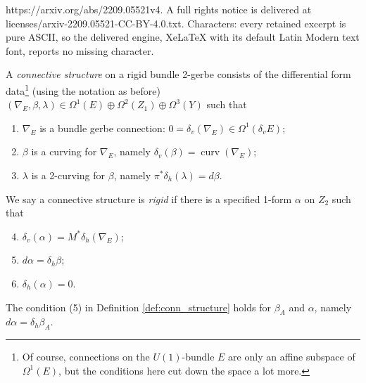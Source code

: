 \documentclass[10pt,a4paper]{amsart}
\DeclareMathOperator{\curv}{curv}
\begin{document}
https://arxiv.org/abs/2209.05521v4. A full rights notice is delivered at licenses/arxiv-2209.05521-CC-BY-4.0.txt. Characters: every retained excerpt is pure ASCII, so the delivered engine, XeLaTeX with its default Latin Modern text font, reports no missing character.
\begin{definition}\label{def:conn_structure}
A \emph{connective structure} on a rigid bundle 2-gerbe consists of the differential form data\footnote{Of course, connections on the $U(1)$-bundle $E$ are only an affine subspace of $\Omega^1(E)$, but the conditions here cut down the space a lot more.} (using the notation as before) $(\nabla_E,\beta,\lambda) \in \Omega^1(E) \oplus \Omega^2(Z_1) \oplus  \Omega^3(Y)$ such that
\begin{enumerate}
\item $\nabla_E$ is a bundle gerbe connection: $0=\delta_v(\nabla_E) \in \Omega^1(\delta_vE)$;
\item $\beta$ is a curving for $\nabla_E$, namely $\delta_v(\beta) = \curv(\nabla_E)$;
\item $\lambda$ is a 2-curving for $\beta$, namely $\pi^*\delta_h(\lambda) = d\beta$.
\end{enumerate}
We say a connective structure is \emph{rigid} if there is a specified 1-form $\alpha$ on $Z_2$ such that
\begin{enumerate}\setcounter{enumi}{3}
\item $\delta_v(\alpha) = M^*\delta_h(\nabla_E)$;
\item $d\alpha = \delta_h\beta$;
\item $\delta_h(\alpha)=0$.
\end{enumerate}
\end{definition}

\begin{lemma}\label{lemma:rigid_conn_str_2}
The condition (5) in Definition \ref{def:conn_structure} holds for $\beta_A$ and $\alpha$, namely $d\alpha = \delta_h\beta_A$.
\end{lemma}
\end{document}
